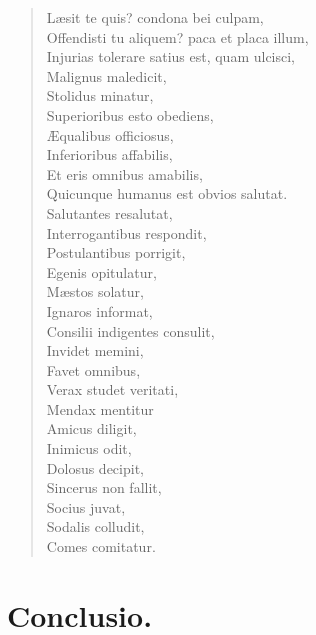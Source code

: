 \begin{verse}
  Læsit te quis? condona bei culpam,\\
  Offendisti tu aliquem? paca et placa illum,\\
  Injurias tolerare satius est, quam ulcisci,\\
  Malignus maledicit,\\
  Stolidus minatur,\\
  Superioribus esto obediens,\\
  Æqualibus officiosus,\\
  Inferioribus affabilis,\\
  Et eris omnibus amabilis,\\
  Quicunque humanus est obvios salutat.\\
  Salutantes resalutat,\\
  Interrogantibus respondit,\\
  Postulantibus porrigit,\\
  Egenis opitulatur,\\
  Mæstos solatur,\\
  Ignaros informat,\\
  Consilii indigentes consulit,\\
  Invidet memini,\\
  Favet omnibus,\\
  Verax studet veritati,\\
  Mendax mentitur\\
  Amicus diligit,\\
  Inimicus odit,\\
  Dolosus decipit,\\
  Sincerus non fallit,\\
  Socius juvat,\\
  Sodalis colludit,\\
  Comes comitatur.\\
\end{verse}



\chapter{Conclusio.}


